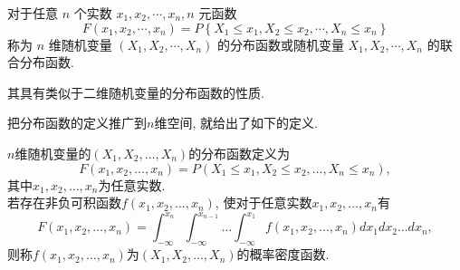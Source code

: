     \begin{definition}
        对于任意 $n$ 个实数 $x_1, x_2, \cdots, x_n, n$ 元函数
        $$
            F\left(x_1, x_2, \cdots, x_n\right)=P\left\{X_1 \leq x_1, X_2 \leq x_2, \cdots, X_n \leq x_n\right\}
        $$
        称为 $n$ 维随机变量 $\left(X_1, X_2, \cdots, X_n\right)$ 的分布函数或随机变量 $X_1, X_2, \cdots, X_n$ 的联合分布函数.
    \end{definition}
    其具有类似于二维随机变量的分布函数的性质.
    
    把分布函数的定义推广到$n$维空间, 就给出了如下的定义. 

\begin{definition}
    $n$维随机变量的$(X_1,X_2,\dots,X_n)$的分布函数定义为
     \[F(x_1,x_2,\dots,x_n) = P(X_1 \leq x_1,X_2 \leq x_2,\dots,X_n \leq x_n),\]
    其中\(x_1,x_2,\dots,x_n\)为任意实数.\\
    若存在非负可积函数$f(x_1,x_2,\dots,x_n)$, 使对于任意实数$x_1,x_2,\dots,x_n$有
    \[F(x_1,x_2,\dots,x_n) = \int_{-\infty}^{x_n}\int_{-\infty}^{x_{n-1}} \dots \int_{-\infty}^{x_1}f(x_1,x_2,\dots,x_n)d{x_1}d{x_2} \dots d{x_n},\]
    则称\(f(x_1,x_2,\dots,x_n)\)为\((X_1,X_2,\dots,X_n)\)的概率密度函数.
\end{definition}